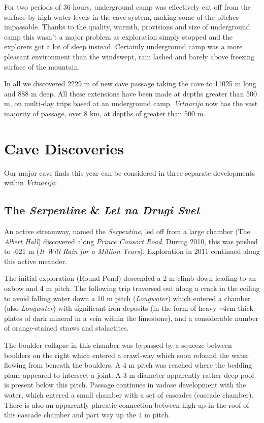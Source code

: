For two periods of 36 hours, underground camp was effectively cut off
from the surface by high water levels in the cave system, making some of
the pitches impassable. Thanks to the quality, warmth, provisions and
size of underground camp this wasn't a major problem as exploration
simply stopped and the explorers got a lot of sleep instead. Certainly
underground camp was a more pleasant environment than the windswept,
rain lashed and barely above freezing surface of the mountain.

In all we discovered 2229 m of new cave passage taking the cave to 11025
m long and 888 m deep. All these extensions have been made at depths
greater than 500 m, on multi-day trips based at an underground camp.
\emph{Vrtnarija} now has the vast majority of passage, over 8 km, at
depths of greater than 500 m.

\hypertarget{cave-discoveries}{%
\section{Cave Discoveries}\label{cave-discoveries}}

Our major cave finds this year can be considered in three separate
developments within \emph{Vrtnarija}:

\hypertarget{the-serpentine-let-na-drugi-svet}{%
\subsection{\texorpdfstring{The \emph{Serpentine} \& \emph{Let na Drugi
Svet}}{The Serpentine \& Let na Drugi Svet}}\label{the-serpentine-let-na-drugi-svet}}

An active streamway, named the \emph{Serpentine}, led off from a large
chamber (The \emph{Albert Hall}) discovered along \emph{Prince Consort
Road}. During 2010, this was pushed to -621 m (\emph{It Will Rain for a
Million Years}). Exploration in 2011 continued along this active
meander.

The initial exploration (Round Pond) descended a 2 m climb down leading
to an oxbow and 4 m pitch. The following trip traversed out along a
crack in the ceiling to avoid falling water down a 10 m pitch
(\emph{Longwater}) which entered a chamber (also \emph{Longwater}) with
significant iron deposits (in the form of heavy \textasciitilde 4cm
thick plates of dark mineral in a vein within the limestone), and a
considerable number of orange-stained straws and stalactites.

The boulder collapse in this chamber was bypassed by a squeeze between
boulders on the right which entered a crawl-way which soon refound the
water flowing from beneath the boulders. A 4 m pitch was reached where
the bedding plane appeared to intersect a joint. A 3 m diameter
apparently rather deep pool is present below this pitch. Passage
continues in vadose development with the water, which entered a small
chamber with a set of cascades (cascade chamber). There is also an
apparently phreatic connection between high up in the roof of this
cascade chamber and part way up the 4 m pitch.

